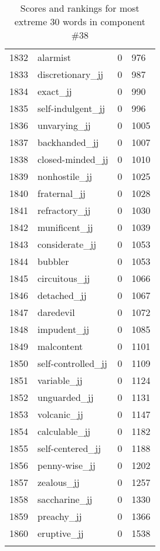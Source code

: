 \begin{longtable}[!htbp]{| rlr@{.}l |}
    1832 & alarmist & 0 & 976 \\
    1833 & discretionary\_jj & 0 & 987 \\
    1834 & exact\_jj & 0 & 990 \\
    1835 & self-indulgent\_jj & 0 & 996 \\
    1836 & unvarying\_jj & 0 & 1005 \\
    1837 & backhanded\_jj & 0 & 1007 \\
    1838 & closed-minded\_jj & 0 & 1010 \\
    1839 & nonhostile\_jj & 0 & 1025 \\
    1840 & fraternal\_jj & 0 & 1028 \\
    1841 & refractory\_jj & 0 & 1030 \\
    1842 & munificent\_jj & 0 & 1039 \\
    1843 & considerate\_jj & 0 & 1053 \\
    1844 & bubbler & 0 & 1053 \\
    1845 & circuitous\_jj & 0 & 1066 \\
    1846 & detached\_jj & 0 & 1067 \\
    1847 & daredevil & 0 & 1072 \\
    1848 & impudent\_jj & 0 & 1085 \\
    1849 & malcontent & 0 & 1101 \\
    1850 & self-controlled\_jj & 0 & 1109 \\
    1851 & variable\_jj & 0 & 1124 \\
    1852 & unguarded\_jj & 0 & 1131 \\
    1853 & volcanic\_jj & 0 & 1147 \\
    1854 & calculable\_jj & 0 & 1182 \\
    1855 & self-centered\_jj & 0 & 1188 \\
    1856 & penny-wise\_jj & 0 & 1202 \\
    1857 & zealous\_jj & 0 & 1257 \\
    1858 & saccharine\_jj & 0 & 1330 \\
    1859 & preachy\_jj & 0 & 1366 \\
    1860 & eruptive\_jj & 0 & 1538 \\
    \hline
    \caption{Scores and rankings for most extreme 30 words in component \#38} \\
\end{longtable}
